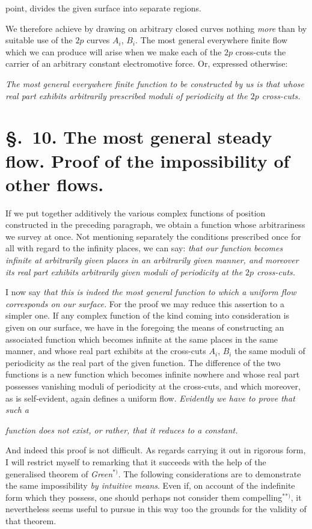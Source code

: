 \documentclass{article}
\begin{document}
point, divides the given surface into separate regions.

We therefore achieve by drawing on arbitrary closed curves nothing \emph{more} than by suitable use of the $2p$ curves $A_{i}$, $B_{i}$. The most general everywhere finite flow which we can produce will arise when we make each of the $2p$ cross-cuts the carrier of an arbitrary constant electromotive force. Or, expressed otherwise:

\emph{The most general everywhere finite function to be constructed by us is that whose real part exhibits arbitrarily prescribed moduli of periodicity at the $2p$ cross-cuts.}

\section*{§.~10. The most general steady flow. Proof of the impossibility of other flows.}

If we put together additively the various complex functions of position constructed in the preceding paragraph, we obtain a function whose arbitrariness we survey at once. Not mentioning separately the conditions prescribed once for all with regard to the infinity places, we can say: \emph{that our function becomes infinite at arbitrarily given places in an arbitrarily given manner, and moreover its real part exhibits arbitrarily given moduli of periodicity at the $2p$ cross-cuts.}

I now say \emph{that this is indeed the most general function to which a uniform flow corresponds on our surface.} For the proof we may reduce this assertion to a simpler one. If any complex function of the kind coming into consideration is given on our surface, we have in the foregoing the means of constructing an associated function which becomes infinite at the same places in the same manner, and whose real part exhibits at the cross-cuts $A_{i}$, $B_{i}$ the same moduli of periodicity as the real part of the given function. The difference of the two functions is a new function which becomes infinite nowhere and whose real part possesses vanishing moduli of periodicity at the cross-cuts, and which moreover, as is self-evident, again defines a uniform flow. \emph{Evidently we have to prove that such a}

\emph{function does not exist, or rather, that it reduces to a constant.}

And indeed this proof is not difficult. As regards carrying it out in rigorous form, I will restrict myself to remarking that it succeeds with the help of the generalised theorem of \emph{Green}${}^{*)}$. The following considerations are to demonstrate the same impossibility \emph{by intuitive means}. Even if, on account of the indefinite form which they possess, one should perhaps not consider them compelling${}^{**)}$, it nevertheless seems useful to pursue in this way too the grounds for the validity of that theorem.
\end{document}
